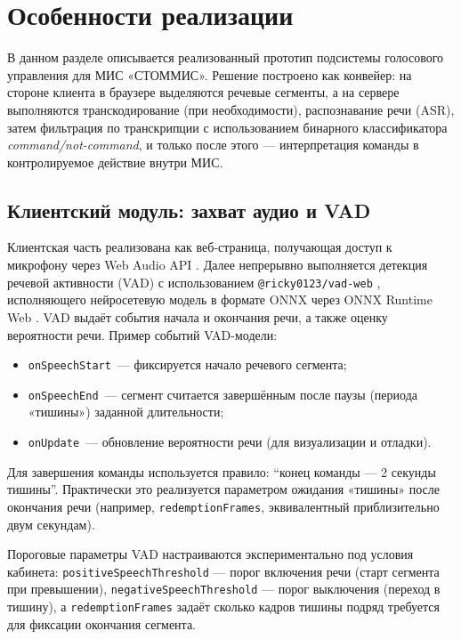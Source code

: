 
\clearpage
\section{Особенности реализации}
\label{sec:solution}

В данном разделе описывается реализованный прототип подсистемы голосового управления для МИС «СТОММИС».
Решение построено как конвейер: на стороне клиента в браузере выделяются речевые сегменты, а на сервере выполняются транскодирование (при необходимости), распознавание речи (ASR), затем фильтрация по транскрипции с использованием бинарного классификатора \textit{command/not-command}, и только после этого --- интерпретация команды в контролируемое действие внутри МИС.


\subsection{Клиентский модуль: захват аудио и VAD}
\label{subsec:task1}

Клиентская часть реализована как веб‑страница, получающая доступ к микрофону через Web Audio API \cite{WebAudio}.
Далее непрерывно выполняется детекция речевой активности (VAD) с использованием \texttt{@ricky0123/vad-web} \cite{RickyVADWeb}, исполняющего нейросетевую модель в формате ONNX через ONNX Runtime Web \cite{ONNXRuntimeWeb}.
VAD выдаёт события начала и окончания речи, а также оценку вероятности речи.
Пример событий VAD-модели:
\begin{itemize}
    \item \texttt{onSpeechStart}~--- фиксируется начало речевого сегмента;
    \item \texttt{onSpeechEnd}~--- сегмент считается завершённым после паузы (периода «тишины») заданной длительности;
    \item \texttt{onUpdate}~--- обновление вероятности речи (для визуализации и отладки).
\end{itemize}

Для завершения команды используется правило: \enquote{конец команды --- 2 секунды тишины}.
Практически это реализуется параметром ожидания «тишины» после окончания речи (например, \texttt{redemptionFrames}, эквивалентный приблизительно двум секундам).

Пороговые параметры VAD настраиваются экспериментально под условия кабинета:
\texttt{positiveSpeechThreshold} — порог включения речи (старт сегмента при превышении),
\texttt{negativeSpeechThreshold} — порог выключения (переход в тишину),
а \texttt{redemptionFrames} задаёт сколько кадров тишины подряд требуется для фиксации окончания сегмента.


